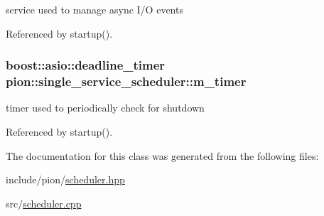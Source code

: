 service used to manage async I/\-O events 



Referenced by startup().

\hypertarget{classpion_1_1single__service__scheduler_a5898ac8ca81dfedb2b38b14d63519c2d}{
\subsubsection[{m\-\_\-timer}]{\setlength{\rightskip}{0pt plus 5cm}boost\-::asio\-::deadline\-\_\-timer pion\-::single\-\_\-service\-\_\-scheduler\-::m\-\_\-timer\hspace{0.3cm}{\ttfamily [protected]}}}\label{classpion_1_1single__service__scheduler_a5898ac8ca81dfedb2b38b14d63519c2d}


timer used to periodically check for shutdown 



Referenced by startup().



The documentation for this class was generated from the following files\-:\begin{DoxyCompactItemize}
\item 
include/pion/\hyperlink{scheduler_8hpp}{scheduler.\-hpp}\item 
src/\hyperlink{scheduler_8cpp}{scheduler.\-cpp}\end{DoxyCompactItemize}

